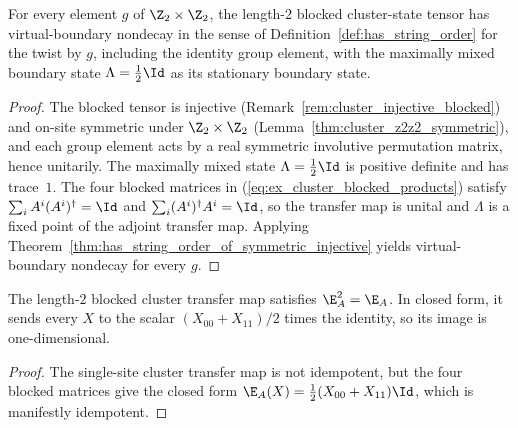\begin{lemma}\label{thm:cluster_string_order}
    \leanok
    For every element $g$ of $\Z_2 \times \Z_2$, the length-$2$ blocked
    cluster-state tensor has virtual-boundary nondecay in the sense of
    Definition~\ref{def:has_string_order} for the twist by $g$, including the
    identity group element, with the
    maximally mixed boundary state $\Lambda = \tfrac{1}{2}\Id$ as its stationary
    boundary state.
\end{lemma}
\begin{proof}
    \leanok
    The blocked tensor is injective (Remark~\ref{rem:cluster_injective_blocked})
    and on-site symmetric under $\Z_2 \times \Z_2$
    (Lemma~\ref{thm:cluster_z2z2_symmetric}), and each group element acts by a
    real symmetric involutive permutation matrix, hence unitarily. The
    maximally mixed state $\Lambda = \tfrac{1}{2}\Id$ is positive definite and
    has trace~$1$. The four blocked matrices in
    (\ref{eq:ex_cluster_blocked_products}) satisfy
    $\sum_i A^i (A^i)^\dagger = \Id$ and
    $\sum_i (A^i)^\dagger A^i = \Id$, so the transfer map is unital and
    $\Lambda$ is a fixed point of the adjoint transfer map. Applying
    Theorem~\ref{thm:has_string_order_of_symmetric_injective} yields virtual-boundary
    nondecay for every $g$.
\end{proof}

\begin{lemma}\label{thm:cluster_blocked_idempotent}
    \leanok
    The length-$2$ blocked cluster transfer map satisfies $\E_A^2 = \E_A$. In
    closed form, it sends every $X$ to the scalar $(X_{00} + X_{11})/2$ times
    the identity, so its image is one-dimensional.
\end{lemma}

\begin{proof}
    \leanok
    The single-site cluster transfer map is not idempotent, but the four blocked
    matrices give the closed form
    $\E_A(X) = \tfrac{1}{2}(X_{00} + X_{11}) \Id$, which is manifestly
    idempotent.
\end{proof}

